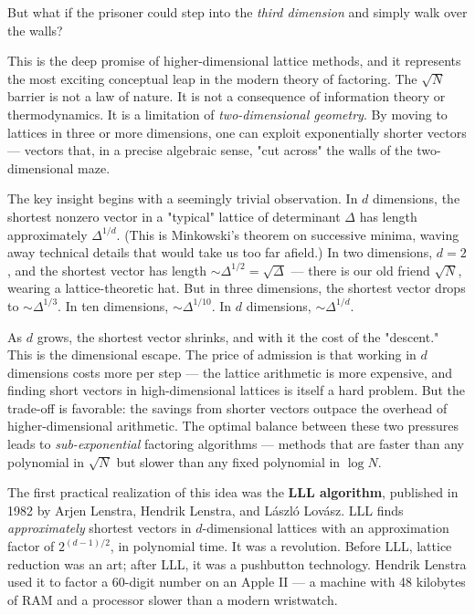 But what if the prisoner could step into the \textit{third dimension} and simply walk over the walls?

This is the deep promise of higher-dimensional lattice methods, and it represents the most exciting conceptual leap in the modern theory of factoring. The $\sqrt{N}$ barrier is not a law of nature. It is not a consequence of information theory or thermodynamics. It is a limitation of \textit{two-dimensional geometry}. By moving to lattices in three or more dimensions, one can exploit exponentially shorter vectors --- vectors that, in a precise algebraic sense, "cut across" the walls of the two-dimensional maze.

The key insight begins with a seemingly trivial observation. In $d$ dimensions, the shortest nonzero vector in a "typical" lattice of determinant $\Delta$ has length approximately $\Delta^{1/d}$. (This is Minkowski's theorem on successive minima, waving away technical details that would take us too far afield.) In two dimensions, $d = 2$, and the shortest vector has length $\sim \Delta^{1/2} = \sqrt{\Delta}$ --- there is our old friend $\sqrt{N}$, wearing a lattice-theoretic hat. But in three dimensions, the shortest vector drops to $\sim \Delta^{1/3}$. In ten dimensions, $\sim \Delta^{1/10}$. In $d$ dimensions, $\sim \Delta^{1/d}$.

As $d$ grows, the shortest vector shrinks, and with it the cost of the "descent." This is the dimensional escape. The price of admission is that working in $d$ dimensions costs more per step --- the lattice arithmetic is more expensive, and finding short vectors in high-dimensional lattices is itself a hard problem. But the trade-off is favorable: the savings from shorter vectors outpace the overhead of higher-dimensional arithmetic. The optimal balance between these two pressures leads to \textit{sub-exponential} factoring algorithms --- methods that are faster than any polynomial in $\sqrt{N}$ but slower than any fixed polynomial in $\log N$.

The first practical realization of this idea was the \textbf{LLL algorithm}, published in 1982 by Arjen Lenstra, Hendrik Lenstra, and L\'aszl\'o Lov\'asz. LLL finds \textit{approximately} shortest vectors in $d$-dimensional lattices with an approximation factor of $2^{(d-1)/2}$, in polynomial time. It was a revolution. Before LLL, lattice reduction was an art; after LLL, it was a pushbutton technology. Hendrik Lenstra used it to factor a 60-digit number on an Apple II --- a machine with 48 kilobytes of RAM and a processor slower than a modern wristwatch.

